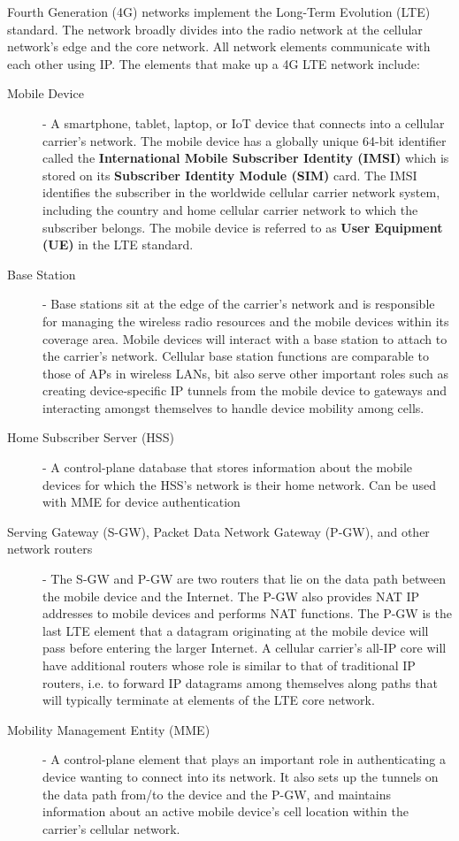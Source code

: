 \documentclass[12pt letter]{report}
\begin{document}
Fourth Generation (4G) networks implement the Long-Term Evolution
(LTE) standard. The network broadly divides into the radio network at
the cellular network's edge and the core network. All network
elements communicate with each other using IP. The elements that make
up a 4G LTE network include:
\begin{description}
  \item[Mobile Device]  - A smartphone, tablet, laptop, or IoT device
    that connects into a cellular carrier's network. The mobile
    device has a globally unique 64-bit identifier called the
    \textbf{International Mobile Subscriber Identity (IMSI)} which is
    stored on its \textbf{Subscriber Identity Module (SIM) } card.
    The IMSI identifies the subscriber in the worldwide cellular
    carrier network system, including the country and home cellular
    carrier network to which the subscriber belongs. The mobile
    device is referred to as \textbf{User Equipment (UE)} in the LTE standard.
  \item[Base Station] - Base stations sit at the edge of the
    carrier's network and is responsible for managing the wireless
    radio resources and the mobile devices within its coverage area.
    Mobile devices will interact with a base station to attach to the
    carrier's network. Cellular base station functions are comparable
    to those of APs in wireless LANs, bit also serve other important
    roles such as creating device-specific IP tunnels from the mobile
    device to gateways and interacting amongst themselves to handle
    device mobility among cells.
  \item[Home Subscriber Server (HSS)] - A control-plane database that
    stores information about the mobile devices for which the HSS's
    network is their home network. Can be used with MME for device
    authentication
  \item[Serving Gateway (S-GW), Packet Data Network Gateway (P-GW),
    and other network routers] - The S-GW and P-GW are two routers
    that lie on the data path between the mobile device and the
    Internet. The P-GW also provides NAT IP addresses to mobile
    devices and performs NAT functions. The P-GW is the last LTE
    element that a datagram originating at the mobile device will
    pass before entering the larger Internet. A cellular carrier's
    all-IP core will have additional routers whose role is similar to
    that of traditional IP routers, i.e. to forward IP datagrams
    among themselves along paths that will typically terminate at
    elements of the LTE core network.
  \item[Mobility Management Entity (MME)] - A control-plane element
    that plays an important role in authenticating a device wanting
    to connect into its network. It also sets up the tunnels on the
    data path from/to the device and the P-GW, and maintains
    information about an active mobile device's cell location within
    the carrier's cellular network.
\end{description}
\end{document}
